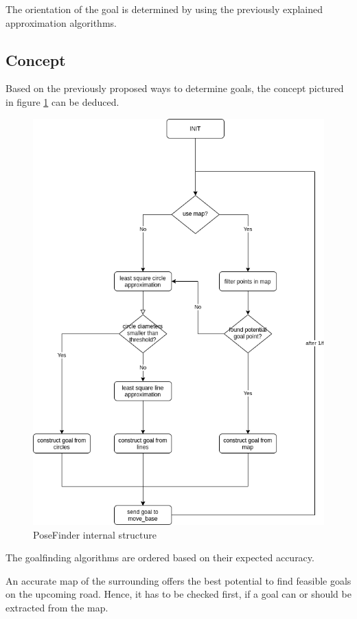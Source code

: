 The orientation of the goal is determined by using the previously explained approximation algorithms.

\subsection{Concept}

Based on the previously proposed ways to determine goals, the concept pictured in figure \ref{posefinder structure} can be deduced.\\

\begin{figure} 
	\centering
	\includegraphics[width=.9\textwidth]{Pictures/posefinder diagram}
	\caption{PoseFinder internal structure}
	\label{posefinder structure}
\end{figure}

The goalfinding algorithms are ordered based on their expected accuracy.

An accurate map of the surrounding offers the best potential to find feasible goals on the upcoming road. Hence, it has to be checked first, if a goal can or should be extracted from the map.

